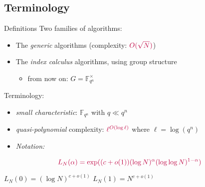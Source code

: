 \documentclass[xcolor=x11names,compress]{beamer}
\theoremstyle{break}
\theoremstyle{sc}
\theoremstyle{definition}
\theoremstyle{remark}
\begin{document}
\subsection{Terminology}
\begin{frame}{Definitions}
  Two families of algorithms:
  \begin{itemize}
    \item The \emph{generic} algorithms (complexity:
      $\textcolor{purple}{O(\sqrt N)}$)
    \item The \emph{index calculus} algorithms, using group structure
      \begin{itemize}
        \item from now on: $G=\mathbb{F}_{q^n}^\times$
      \end{itemize}
    \end{itemize}
    Terminology:
    \begin{itemize}
      \item \emph{small characteristic}: $\mathbb{F}_{q^n}$ with $q\ll q^n$
    \item \emph{quasi-polynomial} complexity:
      $\textcolor{purple}{\ell^{O(\log\ell)}}$ where $\ell=\log(q^n)$
      \item \emph{Notation:}
  \end{itemize}
  \[
    \textcolor{purple}{L_N(\alpha) = \exp((c+o(1))(\log N)^\alpha(\log\log
      N)^{1-\alpha})}
  \]

  \begin{center}
    $L_N(0) = (\log N)^{c+o(1)}$ \phantom{blablabla} $
    L_N(1) = N^{c+o(1)}$
  \end{center}

\end{frame}
\end{document}
